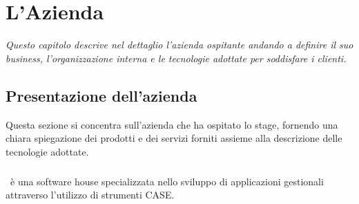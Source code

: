 

\chapter{L'Azienda}
\label{cap1:L'Azienda}






\textit{Questo capitolo descrive nel dettaglio l'azienda ospitante andando a definire il suo business, l’organizzazione interna e le tecnologie adottate per soddisfare i clienti.}

\section{Presentazione dell'azienda}
\label{cap1:Presentazione dell'azienda}
Questa sezione si concentra sull'azienda che ha ospitato lo stage, fornendo una chiara spiegazione dei prodotti e dei servizi forniti assieme alla descrizione delle tecnologie adottate.

\subsection{\azienda}
\label{cap1:Tepui}
\paragraph*{}\azienda\ è una software house specializzata nello sviluppo di applicazioni gestionali attraverso l'utilizzo di strumenti CASE. 

